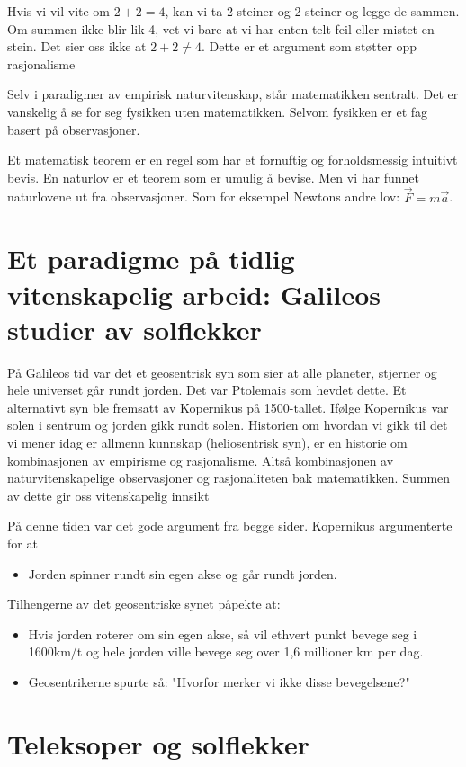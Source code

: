 \documentclass[11pt]{article}
\begin{document}
Hvis vi vil vite om $2+2=4$, kan vi ta 2 steiner og 2 steiner og legge de sammen. Om summen ikke blir lik 4, vet vi bare at vi har enten telt feil eller mistet en stein. 
Det sier oss ikke at $2+2 \neq 4$. Dette er et argument som støtter opp rasjonalisme

Selv i paradigmer av empirisk naturvitenskap, står matematikken sentralt. Det er vanskelig å se for seg fysikken uten matematikken. Selvom fysikken er et fag basert på observasjoner.

Et matematisk teorem er en regel som har et fornuftig og forholdsmessig intuitivt bevis. En naturlov er et teorem som er umulig å bevise.
Men vi har funnet naturlovene ut fra observasjoner. Som for eksempel Newtons andre lov: $\vec{F} = m \vec{a}$.


\section{Et paradigme på tidlig vitenskapelig arbeid: Galileos studier av solflekker}

På Galileos tid var det et geosentrisk syn som sier at alle planeter, stjerner og hele universet går rundt jorden. Det var Ptolemais som hevdet dette. Et alternativt
syn ble fremsatt av Kopernikus på 1500-tallet. Ifølge Kopernikus var solen i sentrum og jorden gikk rundt solen. Historien om hvordan vi gikk til det vi mener idag er allmenn kunnskap (heliosentrisk syn), er en historie om kombinasjonen av empirisme og rasjonalisme. Altså kombinasjonen av naturvitenskapelige observasjoner og 
rasjonaliteten bak matematikken. Summen av dette gir oss vitenskapelig innsikt


På denne tiden var det gode argument fra begge sider. Kopernikus argumenterte for at
\begin{itemize}
    \item Jorden spinner rundt sin egen akse og går rundt jorden.
\end{itemize}

Tilhengerne av det geosentriske synet påpekte at:
\begin{itemize}
    \item Hvis jorden roterer om sin egen akse, så vil ethvert punkt bevege seg i 1600km/t og hele jorden ville bevege seg over 1,6 millioner km per dag.
    \item Geosentrikerne spurte så: "Hvorfor merker vi ikke disse bevegelsene?"
\end{itemize}


\section{Teleksoper og solflekker}
\end{document}
